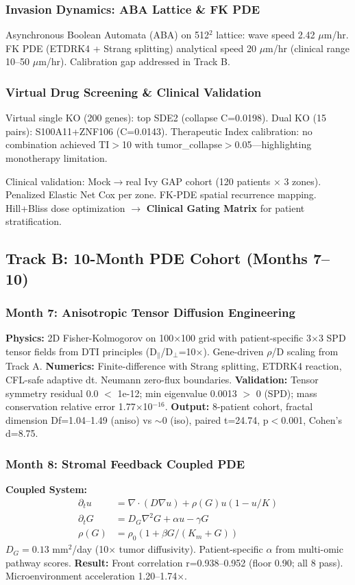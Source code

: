 \documentclass[11pt, twocolumn]{article}
\begin{document}
\subsubsection{Invasion Dynamics: ABA Lattice \& FK PDE}
Asynchronous Boolean Automata (ABA) on 512$^2$ lattice: wave speed 2.42 $\mu$m/hr. FK PDE (ETDRK4 + Strang splitting) analytical speed 20 $\mu$m/hr (clinical range 10--50 $\mu$m/hr). Calibration gap addressed in Track B.

\subsubsection{Virtual Drug Screening \& Clinical Validation}
Virtual single KO (200 genes): top SDE2 (collapse C=0.0198). Dual KO (15 pairs): S100A11+ZNF106 (C=0.0143). Therapeutic Index calibration: no combination achieved TI$>$10 with tumor\_collapse$>$0.05—highlighting monotherapy limitation.

Clinical validation: Mock$\to$real Ivy GAP cohort (120 patients $\times$ 3 zones). Penalized Elastic Net Cox per zone. FK-PDE spatial recurrence mapping. Hill+Bliss dose optimization $\to$ \textbf{Clinical Gating Matrix} for patient stratification.

\subsection{Track B: 10-Month PDE Cohort (Months 7--10)}

\subsubsection{Month 7: Anisotropic Tensor Diffusion Engineering}
\textbf{Physics:} 2D Fisher-Kolmogorov on 100$\times$100 grid with patient-specific 3$\times$3 SPD tensor fields from DTI principles (D$_\parallel$/D$_\perp$=10$\times$). Gene-driven $\rho$/D scaling from Track A.
\textbf{Numerics:} Finite-difference with Strang splitting, ETDRK4 reaction, CFL-safe adaptive dt. Neumann zero-flux boundaries.
\textbf{Validation:} Tensor symmetry residual 0.0 $<$ 1e-12; min eigenvalue 0.0013 $>$ 0 (SPD); mass conservation relative error 1.77$\times$10$^{-16}$.
\textbf{Output:} 8-patient cohort, fractal dimension Df=1.04--1.49 (aniso) vs $\sim$0 (iso), paired t=24.74, p$<$0.001, Cohen's d=8.75.

\subsubsection{Month 8: Stromal Feedback Coupled PDE}
\textbf{Coupled System:}
\begin{align}
\partial_t u &= \nabla\cdot(D\nabla u) + \rho(G) u(1-u/K) \\
\partial_t G &= D_G\nabla^2 G + \alpha u - \gamma G \\
\rho(G) &= \rho_0(1 + \beta G/(K_m + G))
\end{align}
$D_G = 0.13$ mm$^2$/day (10$\times$ tumor diffusivity). Patient-specific $\alpha$ from multi-omic pathway scores.
\textbf{Result:} Front correlation r=0.938--0.952 (floor 0.90; all 8 pass). Microenvironment acceleration 1.20--1.74$\times$.
\end{document}
